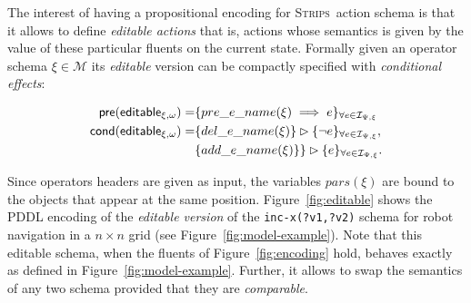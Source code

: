 \documentclass[letterpaper]{article} %
\newcommand{\pre}{\mathsf{pre}}     %
\newcommand{\cond}{\mathsf{cond}}   %
\newcommand{\strips}{\textsc{Strips}}     %
\begin{document}
The interest of having a propositional encoding for \strips\ action schema is that it allows to define {\em editable actions} that is, actions whose semantics is given by the value of these particular fluents on the current state. Formally given an operator schema $\xi\in\mathcal{M}$ its {\em editable} version can be compactly specified with {\em conditional effects}:
\begin{small}  
\begin{align*}
\hspace*{7pt}\pre(\mathsf{editable_{\xi,\omega}})=&\{pre\_e\_name(\xi)\implies e\}_{\forall e\in{\mathcal I}_{\Psi,\xi}}\\
\cond(\mathsf{editable_{\xi,\omega}})=&\{del\_e\_name(\xi)\}\rhd\{\neg e\}_{\forall e\in{\mathcal I}_{\Psi,\xi}},\\
&\{add\_e\_name(\xi)\}\}\rhd\{e\}_{\forall e\in{\mathcal I}_{\Psi,\xi}}.
\end{align*}
\end{small}
Since operators headers are given as input, the variables $pars(\xi)$ are bound to the objects that appear at the same position. Figure~\ref{fig:editable} shows the PDDL encoding of the {\em editable version} of the {\tt\small inc-x(?v1,?v2)} schema for robot navigation in a $n\times n$ grid (see Figure~\ref{fig:model-example}). Note that this editable schema, when the fluents of Figure~\ref{fig:encoding} hold, behaves exactly as defined in Figure~\ref{fig:model-example}. Further, it allows to swap the semantics of any two schema provided that they are {\em comparable}. 
\end{document}
